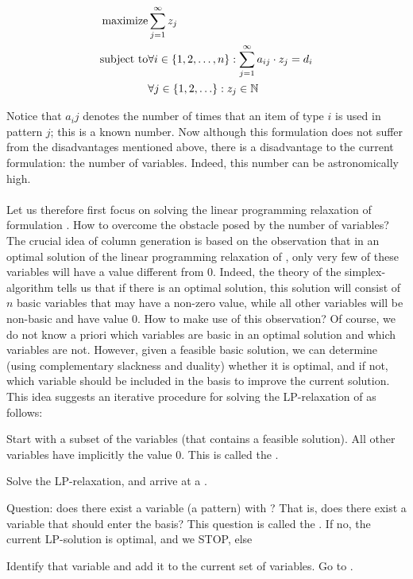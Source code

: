 \begin{eqnarray}
\mbox{maximize}&\sumieqb[j]{1}{\infty}{z_j}\eqnlab{cuttingb-m}\\
\mbox{subject to}&\forall i\in\accl{1,2,\ldots,n}:\sumieqb[j]{1}{\infty}{a_{ij}\cdot z_j}=d_i\eqnlab{cuttingb-c1}\\
&\forall j\in\accl{1,2,\ldots}:z_j\in\NNN\eqnlab{cuttingb-c2}
\end{eqnarray}

Notice that $a_ij$ denotes the number of times that an item of type $i$ is used in pattern $j$; this is a known number. Now although this formulation does not suffer from the disadvantages mentioned above, there is a disadvantage to the current formulation: the number of variables. Indeed, this number can be astronomically high.

\paragraph{}
Let us therefore first focus on solving the linear programming relaxation of formulation . How to overcome the obstacle posed by the number of variables? The crucial idea of column generation is based on the observation that in an optimal solution of the linear programming relaxation of , only very few of these variables will have a value different from $0$. Indeed, the theory of the simplex-algorithm tells us that if there is an optimal solution, this solution will consist of $n$ basic variables that may have a non-zero value, while all other variables will be non-basic and have value $0$. How to make use of this observation? Of course, we do not know a priori which variables are basic in an optimal solution and which variables are not. However, given a feasible basic solution, we can determine (using complementary slackness and duality) whether it is optimal, and if not, which variable should be included in the basis to improve the current solution. This idea suggests an iterative procedure for solving the LP-relaxation of  as follows:

\begin{stepenum}
 \item {}Start with a subset of the variables (that contains a feasible solution). All other variables have implicitly the value $0$. This is called the .
 \item {}Solve the LP-relaxation, and arrive at a .
 \item {}Question: does there exist a variable (a pattern) with ? That is, does there exist a variable that should enter the basis? This question is called the . If no, the current LP-solution is optimal, and we STOP, else
 \item {}Identify that variable and add it to the current set of variables. Go to .
\end{stepenum}

